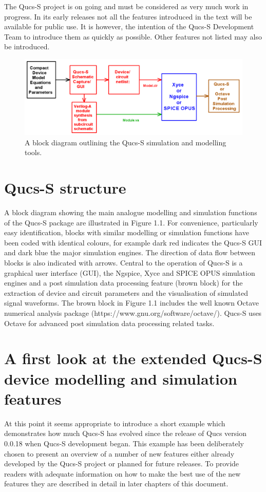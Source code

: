 \documentclass[10pt, a4paper]{report}
\begin{document}
\noindent The Qucs-S project is on going and must be considered as very much work in progress. In its early releases not all the features introduced in the text will be available for public use. It is however, the intention of the Qucs-S Development Team to introduce them as quickly as possible. Other features not listed may also be introduced.   

 
\begin{figure}[h]
	\centering
	\includegraphics*[width=12cm]{pics/chap1/QUCS-S-CH1-Fig1.pdf}
	\caption{A block diagram outlining the Qucs-S simulation and modelling tools.}
	\label{FigCH1-1}
\end{figure}

\section{Qucs-S structure}
A block diagram showing the main analogue modelling and simulation functions of the Qucs-S package are illustrated in Figure 1.1.  For convenience, particularly easy identification, blocks with  similar modelling or simulation functions have been coded with identical colours, for example dark red indicates the Qucs-S GUI and dark blue the major simulation engines. The direction of data flow between blocks is also indicated with arrows. Central to the operation of Qucs-S is a graphical user interface (GUI), the Ngspice, Xyce and SPICE OPUS simulation engines and a post simulation data processing feature (brown block) for the extraction of device and circuit parameters and the visualisation of simulated signal waveforms. The brown block in Figure 1.1 includes the well known Octave numerical analysis package (https://www.gnu.org/software/octave/). Qucs-S uses Octave for advanced post simulation data processing related tasks.  

\section{A first look at the extended Qucs-S device modelling and simulation features}
At this point it seems appropriate to introduce a short example which demonstrates how much Qucs-S has evolved since the release of Qucs version 0.0.18 when Qucs-S development began. This example has been deliberately chosen to present an overview of a number of new features either already developed by the Qucs-S project or planned for future releases. To provide readers with adequate information on how to make the best use of the new features they are described in detail in later chapters of this document. 
\end{document}
